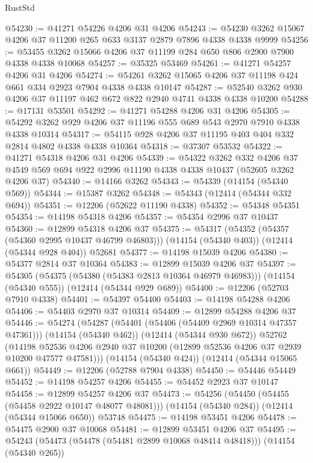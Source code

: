 \begin{lexlean}{RustStd}
\begin{coremodule}
{\begin{coremodule}
{{{{{{{{{{{{{{{{{{{{{{{{{{{{{{{{{{{{{{{{{{{{{{{{{{@54230 := @41271 @54226 @4206 @31 @4206
@54243 := @54230 @3262 @15067 @4206 @37 @11200 @265 @633 @3137 @2879 @7896 @4338 @4338 @9999
@54256 := @53455 @3262 @15066 @4206 @37 @11199 @284 @650 @806 @2900 @7900 @4338 @4338 @10068
@54257 := @35325 @53469
@54261 := @41271 @54257 @4206 @31 @4206
@54274 := @54261 @3262 @15065 @4206 @37 @11198 @424 @661 @334 @2923 @7904 @4338 @4338 @10147
@54287 := @52540 @3262 @930 @4206 @37 @11197 @462 @672 @822 @2940 @4741 @4338 @4338 @10200
@54288 := @17131 @53501
@54292 := @41271 @54288 @4206 @31 @4206
@54305 := @54292 @3262 @929 @4206 @37 @11196 @555 @689 @543 @2970 @7910 @4338 @4338 @10314
@54317 := @54115 @928 @4206 @37 @11195 @403 @404 @332 @2814 @4802 @4338 @4338 @10364
@54318 := @37307 @53532
@54322 := @41271 @54318 @4206 @31 @4206
@54339 := @54322
    @3262
    @332
    @4206
    @37
    @4549
    @569
    @694
    @922
    @2996
    @11190
    @4338
    @4338
    @10437
    (@52605 @3262 @4206 @37)
@54340 := @14166 @3262
@54343 := @54339 (@14154 (@54340 @569))
@54344 := @15387 @3262
@54348 := @54343 (@12414 (@54344 @332 @694))
@54351 := @12206 (@52622 @11190 @4338)
@54352 := @54348 @54351
@54354 := @14198 @54318 @4206
@54357 := @54354 @2996 @37 @10437
@54360 := @12899 @54318 @4206 @37
@54375 := @54317
    (@54352 (@54357 (@54360 @2995 @10437 @46799 @46803)))
    (@14154 (@54340 @403))
    (@12414 (@54344 @928 @404))
    @52681
@54377 := @14198 @15039 @4206
@54380 := @54377 @2814 @37 @10364
@54383 := @12899 @15039 @4206 @37
@54397 := @54305
    (@54375 (@54380 (@54383 @2813 @10364 @46979 @46983)))
    (@14154 (@54340 @555))
    (@12414 (@54344 @929 @689))
@54400 := @12206 (@52703 @7910 @4338)
@54401 := @54397 @54400
@54403 := @14198 @54288 @4206
@54406 := @54403 @2970 @37 @10314
@54409 := @12899 @54288 @4206 @37
@54446 := @54274
    (@54287
      (@54401 (@54406 (@54409 @2969 @10314 @47357 @47361)))
      (@14154 (@54340 @462))
      (@12414 (@54344 @930 @672))
      @52762
      (@14198 @52536 @4206 @2940 @37 @10200 (@12899 @52536 @4206 @37 @2939 @10200 @47577 @47581)))
    (@14154 (@54340 @424))
    (@12414 (@54344 @15065 @661))
@54449 := @12206 (@52788 @7904 @4338)
@54450 := @54446 @54449
@54452 := @14198 @54257 @4206
@54455 := @54452 @2923 @37 @10147
@54458 := @12899 @54257 @4206 @37
@54473 := @54256
    (@54450 (@54455 (@54458 @2922 @10147 @48077 @48081)))
    (@14154 (@54340 @284))
    (@12414 (@54344 @15066 @650))
    @53748
@54475 := @14198 @53451 @4206
@54478 := @54475 @2900 @37 @10068
@54481 := @12899 @53451 @4206 @37
@54495 := @54243
    (@54473 (@54478 (@54481 @2899 @10068 @48414 @48418)))
    (@14154 (@54340 @265))
}}}}}}}}}}}}}}}}}}}}}}}}}}}}}}}}}}}}}}}}}}}}}}}}}}
\end{coremodule}}
\end{coremodule}
\end{lexlean}
